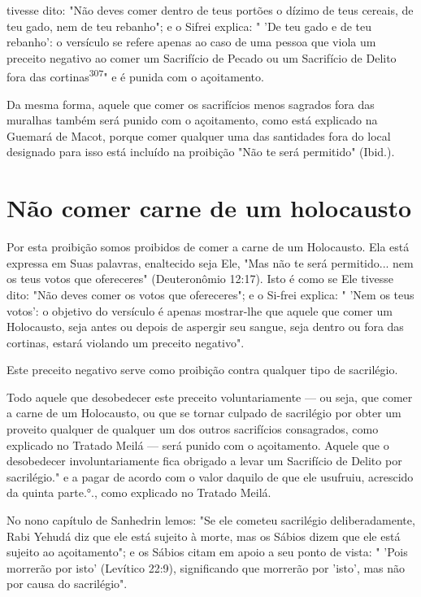 \begin{itemize}
\begin{enumrate}
\begin{itemize}
\begin{itemize}
\begin{itemize}
\begin{enumerate}
\end{enumerate}


tivesse dito: "Não deves comer dentro de teus portões o dízimo de teus
ce­reais, de teu gado, nem de teu rebanho"; e o Sifrei explica: " 'De
teu gado e de teu rebanho': o versículo se refere apenas ao caso de uma
pessoa que viola um preceito negativo ao comer um Sacrifício de Pecado
ou um Sacrifício de Delito fora das cortinas\textsuperscript{307}" e é
punida com o açoitamento.

Da mesma forma, aquele que comer os sacrifícios menos sagrados fora das
muralhas também será punido com o açoitamento, como está explica­do na
Guemará de Macot, porque comer qualquer uma das santidades fora do local
designado para isso está incluído na proibição "Não te será permitido"
(Ibid.).

\section{Não comer carne de um holocausto}

Por esta proibição somos proibidos de comer a carne de um Holo­causto.
Ela está expressa em Suas palavras, enaltecido seja Ele, "Mas não te
será permitido... nem os teus votos que ofereceres" (Deuteronômio
12:17). Isto é como se Ele tivesse dito: "Não deves comer os votos que
ofereceres"; e o Si-frei explica: " 'Nem os teus votos': o objetivo do
versículo é apenas mostrar-lhe que aquele que comer um Holocausto, seja
antes ou depois de aspergir seu sangue, seja dentro ou fora das
cortinas, estará violando um preceito negativo".

Este preceito negativo serve como proibição contra qualquer tipo de
sacrilégio.

Todo aquele que desobedecer este preceito voluntariamente --- ou seja,
que comer a carne de um Holocausto, ou que se tornar culpado de
sacrilé­gio por obter um proveito qualquer de qualquer um dos outros
sacrifícios con­sagrados, como explicado no Tratado Meilá --- será
punido com o açoitamento. Aquele que o desobedecer involuntariamente
fica obrigado a levar um Sacrifí­cio de Delito por
sacrilégio." e a pagar de acordo com o valor daquilo
de que ele usufruiu, acrescido da quinta
parte.°., como explicado no Tratado
Meilá.

No nono capítulo de Sanhedrin lemos: "Se ele cometeu sacrilégio
deliberadamente, Rabi Yehudá diz que ele está sujeito à morte, mas os
Sábios dizem que ele está sujeito ao açoitamento"; e os Sábios citam em
apoio a seu ponto de vista: " 'Pois morrerão por isto' (Levítico 22:9),
significando que mor­rerão por 'isto', mas não por causa do sacrilégio".


\end{itemize}
\end{itemize}
\end{itemize}
\end{enumrate}
\end{itemize}
